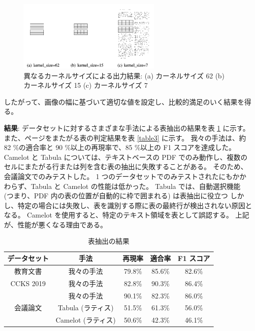 \documentclass[uplatex, twocolumn,10pt]{jsarticle}
\begin{document}
\begin{figure}[tp]
    \begin{center}
        \includegraphics*[width=7cm]{image/master/master2/Fig4.png}
        \caption{異なるカーネルサイズによる出力結果: (a) カーネルサイズ 62 (b) カーネルサイズ 15 (c) カーネルサイズ 7}
        \label{fig4}
    \end{center}
\end{figure}

したがって、画像の幅に基づいて適切な値を設定し、比較的満足のいく結果を得る。

\textbf{結果}:
データセットに対するさまざまな手法による表抽出の結果を表 \ref{table2} に示す。
また、ページをまたがる表の判定結果を表 \ref{table3} に示す。
我々の手法は、約 82 \%の適合率と 90 \%以上の再現率で、85 \%以上の F1 スコアを達成した。
Camelot と Tabula については、テキストベースの PDF でのみ動作し、複数のセルにまたがる行または列を含む表の抽出に失敗することがある。
そのため、会議論文でのみテストした。
1 つのデータセットでのみテストされたにもかかわらず、Tabula と Camelot の性能は低かった。
Tabula では、自動選択機能 (つまり、PDF 内の表の位置が自動的に枠で囲まれる) は表抽出に役立つ
しかし、特定の場合には失敗し、表を識別する際に表の最終行が検出されない原因となる。
Camelot を使用すると、特定のテキスト領域を表として誤認する。
上記が、性能が悪くなる理由である。

\begin{table}[tp]
    \centering
    \caption{表抽出の結果}
    \label{table2}
    \begin{tabular}{ccccc}
        データセット & 手法 & 再現率 & 適合率 & F1 スコア \\
        \toprule
        教育文書 & 我々の手法 & 79.8\% & 85.6\% & 82.6\% \\
        CCKS 2019 & 我々の手法 & 82.8\% & 90.3\% & 86.4\% \\
        \multirow{3}{*}{会議論文} & 我々の手法 & 90.1\% & 82.3\% & 86.0\% \\
                                & Tabula (ラティス) & 51.5\% & 61.3\% & 56.0\% \\
                                & Camelot (ラティス) & 50.6\% & 42.3\% & 46.1\% \\
        \bottomrule
    \end{tabular}
\end{table}
\end{document}
